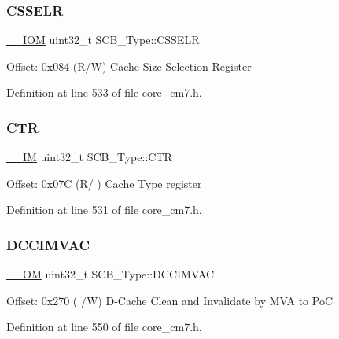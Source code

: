 \subsubsection{\texorpdfstring{C\+S\+S\+E\+LR}{CSSELR}}
{\footnotesize\ttfamily \hyperlink{core__sc300_8h_ab6caba5853a60a17e8e04499b52bf691}{\+\_\+\+\_\+\+I\+OM} uint32\+\_\+t S\+C\+B\+\_\+\+Type\+::\+C\+S\+S\+E\+LR}

Offset\+: 0x084 (R/W) Cache Size Selection Register 

Definition at line 533 of file core\+\_\+cm7.\+h.

\mbox{\label{struct_s_c_b___type_af3fe705fef8762763b6d61dbdf0ccc3d}} 
\subsubsection{\texorpdfstring{C\+TR}{CTR}}
{\footnotesize\ttfamily \hyperlink{core__sc300_8h_a4cc1649793116d7c2d8afce7a4ffce43}{\+\_\+\+\_\+\+IM} uint32\+\_\+t S\+C\+B\+\_\+\+Type\+::\+C\+TR}

Offset\+: 0x07C (R/ ) Cache Type register 

Definition at line 531 of file core\+\_\+cm7.\+h.

\mbox{\label{struct_s_c_b___type_a4f59813582b53feb5f1afbbad3db2022}} 
\subsubsection{\texorpdfstring{D\+C\+C\+I\+M\+V\+AC}{DCCIMVAC}}
{\footnotesize\ttfamily \hyperlink{core__sc300_8h_a0ea2009ed8fd9ef35b48708280fdb758}{\+\_\+\+\_\+\+OM} uint32\+\_\+t S\+C\+B\+\_\+\+Type\+::\+D\+C\+C\+I\+M\+V\+AC}

Offset\+: 0x270 ( /W) D-\/\+Cache Clean and Invalidate by M\+VA to PoC 

Definition at line 550 of file core\+\_\+cm7.\+h.

\mbox{\label{struct_s_c_b___type_af50f7a0a9574fe0e24a68bb4eca75140}} 
